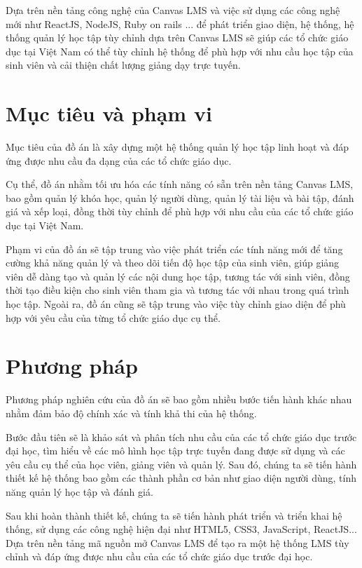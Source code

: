 \documentclass[../Thesis.tex]{subfiles}
\begin{document}
Dựa trên nền tảng công nghệ của Canvas LMS và việc sử dụng các công nghệ mới như ReactJS, NodeJS, Ruby on rails ... để phát triển giao diện, hệ thống, hệ thống quản lý học tập tùy chỉnh dựa trên Canvas LMS sẽ giúp các tổ chức giáo dục tại Việt Nam có thể tùy chỉnh hệ thống để phù hợp với nhu cầu học tập của sinh viên và cải thiện chất lượng giảng dạy trực tuyến.

\section{Mục tiêu và phạm vi}

Mục tiêu của đồ án là xây dựng một hệ thống quản lý học tập linh hoạt và đáp ứng được nhu cầu đa dạng của các tổ chức giáo dục.

Cụ thể, đồ án nhằm tối ưu hóa các tính năng có sẵn trên nền tảng Canvas LMS, bao gồm quản lý khóa học, quản lý người dùng, quản lý tài liệu và bài tập, đánh giá và xếp loại, đồng thời tùy chỉnh để phù hợp với nhu cầu của các tổ chức giáo dục tại Việt Nam.

Phạm vi của đồ án sẽ tập trung vào việc phát triển các tính năng mới để tăng cường khả năng quản lý và theo dõi tiến độ học tập của sinh viên, giúp giảng viên dễ dàng tạo và quản lý các nội dung học tập, tương tác với sinh viên, đồng thời tạo điều kiện cho sinh viên tham gia và tương tác với nhau trong quá trình học tập. Ngoài ra, đồ án cũng sẽ tập trung vào việc tùy chỉnh giao diện để phù hợp với yêu cầu của từng tổ chức giáo dục cụ thể.
\section{Phương pháp}
Phương pháp nghiên cứu của đồ án sẽ bao gồm nhiều bước tiến hành khác nhau nhằm đảm bảo độ chính xác và tính khả thi của hệ thống.

Bước đầu tiên sẽ là khảo sát và phân tích nhu cầu của các tổ chức giáo dục trước đại học, tìm hiểu về các mô hình học tập trực tuyến đang được sử dụng và các yêu cầu cụ thể của học viên, giảng viên và quản lý. Sau đó, chúng ta sẽ tiến hành thiết kế hệ thống bao gồm các thành phần cơ bản như giao diện người dùng, tính năng quản lý học tập và đánh giá.

Sau khi hoàn thành thiết kế, chúng ta sẽ tiến hành phát triển và triển khai hệ thống, sử dụng các công nghệ hiện đại như HTML5, CSS3, JavaScript, ReactJS... Dựa trên nền tảng mã nguồn mở Canvas LMS để tạo ra một hệ thống LMS tùy chỉnh và đáp ứng được nhu cầu của các tổ chức giáo dục trước đại học.
\end{document}
